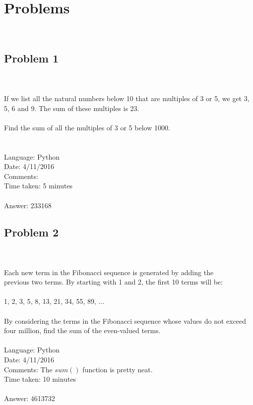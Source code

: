 \documentclass[fleqn]{article}
\begin{document}
\section{Problems} ~\\

\subsection{Problem 1} ~\\
	\\
	If we list all the natural numbers below 10 that are multiples of 3 or 5, we get 3, 5, 6 and 9. The sum of these multiples is 23.\\
	\\
	Find the sum of all the multiples of 3 or 5 below 1000.\\
	\\
	\\
	Language: Python \\
	Date: 4/11/2016 \\
	Comments:\\
	Time taken: 5 minutes\\
	\\
	Answer:  233168\\
	
\subsection{Problem 2} ~\\
	\\
	Each new term in the Fibonacci sequence is generated by adding the\\ previous
	two terms. By starting with 1 and 2, the first 10 terms will be:\\
	\\
	1, 2, 3, 5, 8, 13, 21, 34, 55, 89, ...\\
	\\
	By considering the terms in the Fibonacci sequence whose values do not
	exceed four million, find the sum of the even-valued terms.
	\\
	\\
	Language: Python \\
	Date: 4/11/2016 \\
	Comments: The $sum()$ function is pretty neat.\\
	Time taken: 10 minutes\\
	\\
	Answer:  4613732\\
\end{document}
